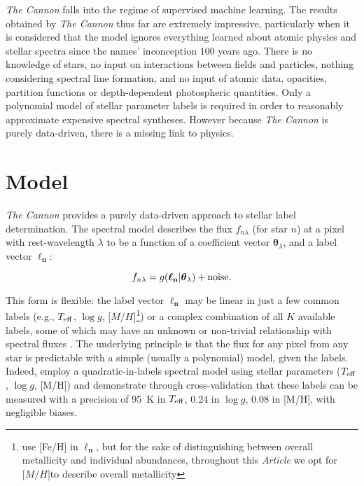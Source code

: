 \documentclass[useAMS,usenatbib]{mn2e}
\newcommand\article{\textit{Article}}
\newcommand\tc{\textit{The Cannon}}
\newcommand\lv{\mathbf{\boldsymbol\ell_n}}
\newcommand\cv{{\boldsymbol\theta}_\lambda}
\newcommand\given{|}
\newcommand\teff{$T_{\rm eff}$}
\newcommand\logg{$\log{g}$}
\newcommand\mh{${\mathrm [M/H]}$}
\begin{document}

\tc{} falls into the regime of supervised machine learning. The results obtained by \tc{} thus far are extremely impressive, particularly when it is considered that the model ignores everything learned about atomic physics and stellar spectra since the names' inconception 100 years ago. There is no knowledge of stars, no input on interactions between fields and particles, nothing considering spectral line formation, and no input of atomic data, opacities, partition functions or depth-dependent photospheric quantities. Only a polynomial model of stellar parameter labels is required in order to reasonably approximate expensive spectral syntheses. However because \tc{} is purely data-driven, there is a missing link to physics.




\section{Model}

\tc{} provides a purely data-driven approach to stellar label determination. The
spectral model describes the flux $f_{n\lambda}$ (for star $n$) at a pixel with rest-wavelength $\lambda$ to be a function
of a coefficient vector $\cv$, and a label vector $\lv$:

\begin{equation}
    f_{n\lambda} = g(\lv\given\cv) + {\rm noise}.
    \label{eq:cannon}
\end{equation}

This form is flexible: the label vector $\lv$ may be linear in just a few common
labels (e.g., \teff, \logg, \mh\footnote{\citet{Ness15a} use [Fe/H] in $\lv$, but for the 
sake of distinguishing between overall metallicity and individual abundances,
throughout this \article{} we opt for \mh to describe overall metallicity})
or a complex combination of all $K$ available labels, some of which may have an
 unknown or non-trivial relationship with spectral fluxes \citep[e.g., ages, 
 masses, see][]{Nissen15, Ness15b}. The underlying principle
is that the flux for any pixel from any star is predictable with a simple (usually
 a polynomial) model, given the labels. Indeed, \citet{Ness15a}
employ a quadratic-in-labels spectral model using stellar
parameters ($T_{\rm eff}$, $\log{g}$, [M/H])
and demonstrate through cross-validation that these labels can be 
measured with a precision of 95~K in $T_{\rm eff}$, 0.24 in $\log{g}$, 0.08 in 
[M/H], with negligible biases. 
\end{document}
